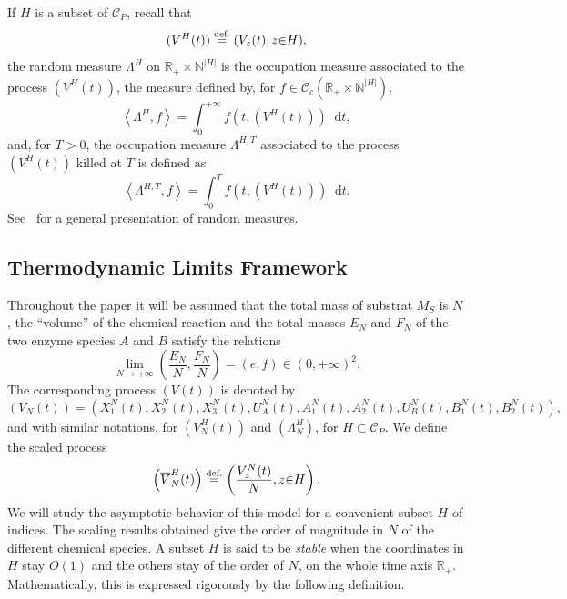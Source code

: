 \documentclass[english]{amsart}
\newcommand{\N}{\ensuremath{\mathbb{N}}}
\newcommand{\R}{\ensuremath{\mathbb{R}}}
\newcommand{\diff}{\mathop{}\mathopen{}\mathrm{d}}
\newcommand{\cal}[1]{\ensuremath{\mathcal{#1}}}
\newcommand\croc[1]{\left\langle #1\right\rangle}
\newcommand\steq[1]{\stackrel{\text{\rm #1.}}{=}}
\numberwithin{proposition}{section}
\begin{document}
If $H$ is a subset  of ${\cal C}_P$, recall that
\[
(V^H(t))\steq{def} (V_z(t),z{\in}H),
\]
the random measure $\Lambda^H$ on $\R_+{\times}\N^{|H|}$ is the occupation measure associated to the process $(V^H(t))$,  the measure defined by, for $f{\in}{\cal C}_c(\R_+{\times}\N^{|H|})$,
\[
\croc{\Lambda^H,f}=\int_0^{+\infty} f\left(t,(V^H(t))\right)\diff t,
\]
and, for $T{>}0$, the occupation measure $\Lambda^{H,T}$ associated to the  process $(V^H(t))$ killed at $T$ is defined as
\begin{equation}\label{OccT}
\croc{\Lambda^{H,T},f}=\int_0^{T} f\left(t,(V^H(t))\right)\diff t.
\end{equation}
See~\citet{Dawson} for a general presentation of random measures.



\subsection{Thermodynamic Limits Framework}\label{ScalingC}
Throughout the paper it will be assumed that the total mass of substrat $M_S$ is $N$, the ``volume'' of the chemical reaction and the total masses $E_N$ and $F_N$ of the two enzyme species ${ A}$ and ${B}$ satisfy the relations
\begin{equation}\label{TLimits}
\lim_{N\to+\infty}\left(\frac{E_N}{N},\frac{F_N}{N}\right)=(e,f) \in (0, +\infty)^2.
\end{equation}
The corresponding process $(V(t))$ is denoted by
\[
(V_N(t))=(X^N_1(t), X^N_2(t), X^N_3(t),U_A^N(t),A^N_1(t),A^N_2(t),U_B^N(t),B^N_1(t),B^N_2(t)),
\]
and with similar notations,  for  $(V_N^H(t))$ and $(\Lambda_N^H)$, for $H{\subset}{\cal C}_P$. We define the scaled process
\begin{equation}\label{ScalNot}
\left(\overline{V}^H_{N}(t)\right)\steq{def}\left(\frac{V_z^N(t)}{N},z{\in}H\right).
\end{equation}
We will study the asymptotic behavior of this model for a convenient subset $H$ of indices. The scaling results obtained give the order of magnitude in $N$ of the different chemical species. A subset $H$ is said to be {\em stable} when the coordinates in $H$ stay $O(1)$ and the others stay of the order of $N$, on the whole time axis $\R_+$.  Mathematically, this is expressed rigorously by the following definition.
\end{document}
